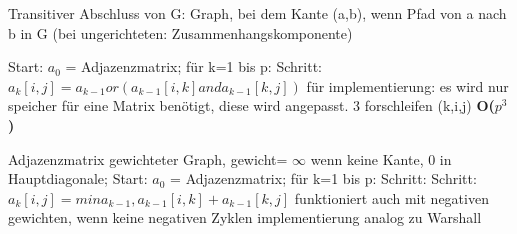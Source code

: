 Transitiver Abschluss von G: Graph, bei dem Kante (a,b), wenn Pfad von a nach b in G
(bei ungerichteten: Zusammenhangskomponente)


Start: $a_0$ = Adjazenzmatrix;
für k=1 bis p: Schritt: $a_k[i,j] = a_{k-1} or( a_{k-1}[i,k] and a_{k-1}[k,j] )$
für implementierung: es wird nur speicher für eine Matrix benötigt, diese wird angepasst. 3 forschleifen (k,i,j)
\textbf{O($p^3$)}

Adjazenzmatrix gewichteter Graph, gewicht= $\infty$ wenn keine Kante, 0 in Hauptdiagonale;
Start: $a_0$ = Adjazenzmatrix;
für k=1 bis p: Schritt: Schritt: $a_k[i,j] = min{a_{k-1} , a_{k-1}[i,k] + a_{k-1}[k,j] }$
funktioniert auch mit negativen gewichten, wenn keine negativen Zyklen
implementierung analog zu Warshall
